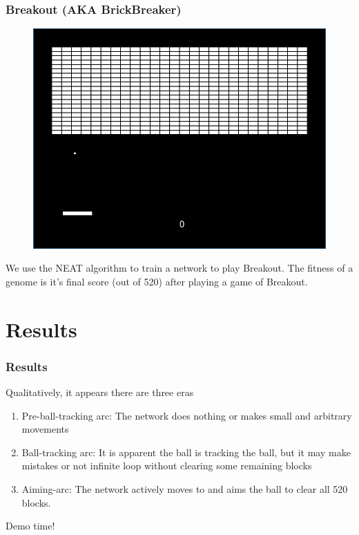 \documentclass[t,pdflatex]{beamer}
\begin{document}
        \begin{frame}

            \frametitle{Breakout (AKA BrickBreaker)}
        \begin{figure}
        \centering
        \includegraphics[width=.54 \textwidth]{breakout.png}
        \end{figure}

        We use the NEAT algorithm to train a network to play Breakout.
        The fitness of a genome is it's final score (out of 520) after playing a game of Breakout.

    \end{frame}

\section{Results}

    \begin{frame}

        \frametitle{Results}
        Qualitatively, it appears there are three eras
        \begin{enumerate}
            \item Pre-ball-tracking arc: The network does nothing or makes small and arbitrary movements
            \item Ball-tracking arc: It is apparent the ball is tracking the ball, but it may make mistakes or not infinite loop without clearing some remaining blocks
            \item Aiming-arc: The network actively moves to and aims the ball to clear all 520 blocks.
        \end{enumerate}

        \pause{}
        Demo time!

    \end{frame}
\end{document}
